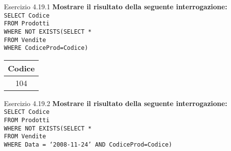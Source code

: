 \begin{frame}{Esercizio 4.19.1}
    \textbf{Mostrare il risultato della seguente interrogazione:}\\
    \texttt{SELECT Codice\\FROM Prodotti\\WHERE NOT EXISTS(SELECT *\\\hspace{8,5em}FROM Vendite\\\hspace{8,5em}WHERE CodiceProd=Codice)}
    \vspace{1em}
    \begin{table}[h]
\centering
\begin{minipage}{.45\textwidth}
\centering
\begin{tabular}{|c|}
\hline
\rowcolor{cyan!30} Codice \\
\hline
104\\
\hline
\end{tabular}
\end{minipage}%
\end{table}
\end{frame}

\begin{frame}{Esercizio 4.19.2}
    \textbf{Mostrare il risultato della seguente interrogazione:}\\
    \texttt{SELECT Codice\\FROM Prodotti\\WHERE NOT EXISTS(SELECT *\\\hspace{8,5em}FROM Vendite\\\hspace{8,5em}WHERE Data = `2008-11-24' AND CodiceProd=Codice)}
\end{frame}

